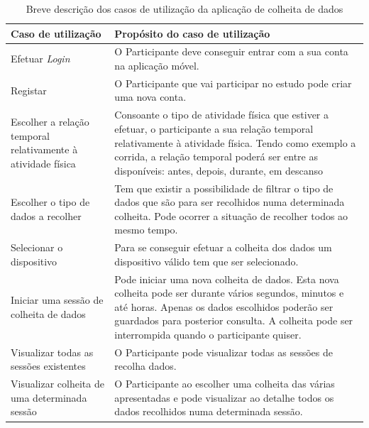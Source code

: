 \begin{table}[H]
\centering

\begin{tabularx}{1\textwidth}{|p{4cm}|p{10.7cm}|}
\rowcolor[HTML]{FFCE93} \hline
\textbf{Caso de utilização} &  \textbf{Propósito do caso de utilização}  \\
\hline
Efetuar \textit{Login}  & O Participante deve conseguir entrar com a sua conta na aplicação móvel. \\ \hline

Registar & O Participante que vai participar no estudo pode criar uma nova  conta. \\ \hline

Escolher a relação temporal relativamente à atividade física & Consoante o tipo de atividade física que estiver a efetuar, o participante a sua relação temporal relativamente à atividade física. Tendo como exemplo a corrida, a relação temporal poderá ser entre as disponíveis: antes, depois, durante, em descanso\\ \hline

Escolher o tipo de dados a recolher & Tem que existir a possibilidade de filtrar o tipo de dados que são para ser recolhidos numa determinada colheita. Pode ocorrer a situação de recolher todos ao mesmo tempo. \\ \hline

Selecionar o dispositivo  & Para se conseguir efetuar a colheita dos dados um dispositivo válido tem que ser selecionado. \\ \hline

Iniciar uma sessão de colheita de dados & Pode iniciar uma nova colheita de dados. Esta nova colheita pode ser durante vários segundos, minutos e até horas. Apenas os dados escolhidos poderão ser guardados para posterior consulta. A colheita pode ser interrompida quando o participante quiser. \\ \hline

Visualizar todas as sessões existentes & O Participante pode visualizar todas as sessões de recolha dados. \\ \hline

Visualizar colheita de uma determinada sessão & O Participante ao escolher uma colheita das várias apresentadas e pode visualizar ao detalhe todos os dados recolhidos numa determinada sessão. \\ \hline    

\end{tabularx}

\caption{Breve descrição dos casos de utilização da aplicação de colheita de dados}
\label{t:android-usecase}
\end{table}

